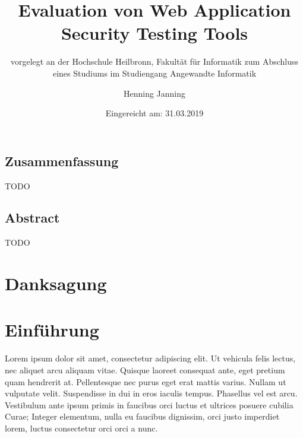 \documentclass[12pt,oneside,a4paper,parskip]{scrbook}
\def\BaAuthor{Henning Janning}
\def\BaTitle{Evaluation von Web Application Security Testing Tools}
\def\BaSupervisorOne{Prof. Andreas Mayer}
\def\BaSupervisorTwo{Susanne Steuer (M.Sc.) }
\def\BaDeadline{31.03.2019}
\begin{document}


\frontmatter
\titlehead{%
  {Hochschule Heilbronn\\
   Fakultät für Informatik}}
\subject{Bachelorarbeit}
\title{\BaTitle\\[15mm]}
\subtitle{\normalsize{vorgelegt an der Hochschule Heilbronn, Fakultät für Informatik zum Abschluss eines Studiums im Studiengang Angewandte Informatik}}
\author{\BaAuthor}
\date{\normalsize{Eingereicht am: \BaDeadline}}
\publishers{
  \normalsize{Erstpr\"{u}fer: \BaSupervisorOne}\\
  \normalsize{Zweitpr\"{u}fer: \BaSupervisorTwo}\\
}


\maketitle



\section*{Zusammenfassung}

TODO

\section*{Abstract}

TODO

\newpage
\chapter*{Danksagung}



\tableofcontents



\mainmatter

\chapter{Einführung}\label{ch:intro}

Lorem ipsum dolor sit amet, consectetur adipiscing elit. Ut vehicula felis lectus, nec aliquet arcu aliquam vitae. Quisque laoreet consequat ante, eget pretium quam hendrerit at. Pellentesque nec purus eget erat mattis varius. Nullam ut vulputate velit. Suspendisse in dui in eros iaculis tempus. Phasellus vel est arcu. Vestibulum ante ipsum primis in faucibus orci luctus et ultrices posuere cubilia Curae; Integer elementum, nulla eu faucibus dignissim, orci justo imperdiet lorem, luctus consectetur orci orci a nunc. \cite{gamma2011patterns}
\end{document}
